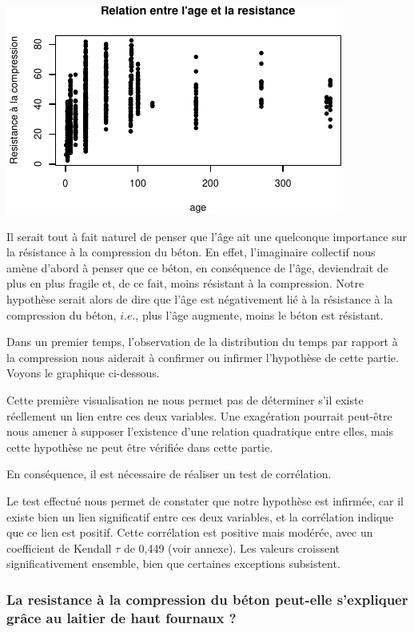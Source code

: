 \documentclass[
  12pt,
]{article}
\begin{document}
\begin{center}\includegraphics{rmd_final_files/figure-latex/unnamed-chunk-12-1} \end{center}

Il serait tout à fait naturel de penser que l'âge ait une quelconque
importance sur la résistance à la compression du béton. En effet,
l'imaginaire collectif nous amène d'abord à penser que ce béton, en
conséquence de l'âge, deviendrait de plus en plus fragile et, de ce
fait, moins résistant à la compression. Notre hypothèse serait alors de
dire que l'âge est négativement lié à la résistance à la compression du
béton, \(i.e.\), plus l'âge augmente, moins le béton est résistant.

Dans un premier temps, l'observation de la distribution du temps par
rapport à la compression nous aiderait à confirmer ou infirmer
l'hypothèse de cette partie. Voyons le graphique ci-dessous.

Cette première visualisation ne nous permet pas de déterminer s'il
existe réellement un lien entre ces deux variables. Une exagération
pourrait peut-être nous amener à supposer l'existence d'une relation
quadratique entre elles, mais cette hypothèse ne peut être vérifiée dans
cette partie.

En conséquence, il est nécessaire de réaliser un test de corrélation.

Le test effectué nous permet de constater que notre hypothèse est
infirmée, car il existe bien un lien significatif entre ces deux
variables, et la corrélation indique que ce lien est positif. Cette
corrélation est positive mais modérée, avec un coefficient de Kendall
\(\tau\) de 0,449 (voir annexe). Les valeurs croissent significativement
ensemble, bien que certaines exceptions subsistent.

\subsubsection{La resistance à la compression du béton peut-elle
s'expliquer grâce au laitier de haut fournaux
?}\label{la-resistance-uxe0-la-compression-du-buxe9ton-peut-elle-sexpliquer-gruxe2ce-au-laitier-de-haut-fournaux}
\end{document}
